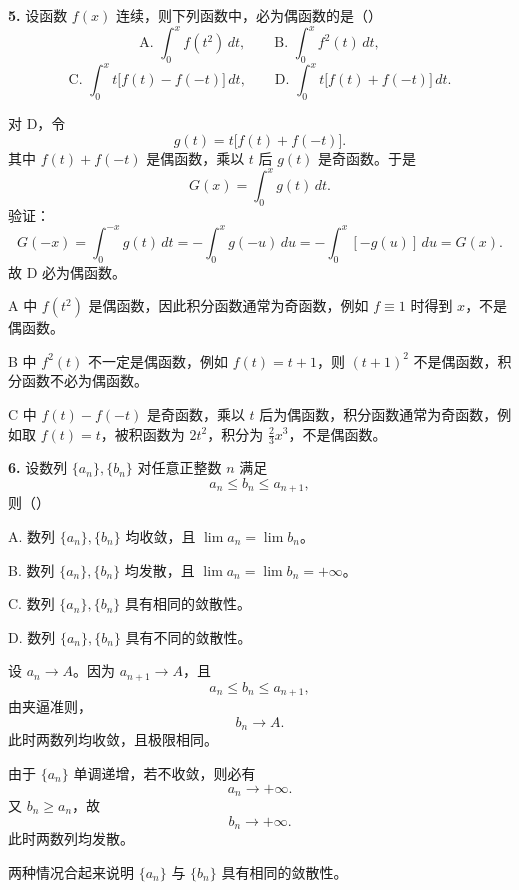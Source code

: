 \begin{problemblock}
\textbf{5.} 设函数 \(f(x)\) 连续，则下列函数中，必为偶函数的是（\quad）
\[
\text{A. }\int_0^x f(t^2)\,dt,\qquad
\text{B. }\int_0^x f^2(t)\,dt,
\]
\[
\text{C. }\int_0^x t\bigl[f(t)-f(-t)\bigr]\,dt,\qquad
\text{D. }\int_0^x t\bigl[f(t)+f(-t)\bigr]\,dt.
\]
\end{problemblock}

\begin{solutionblock}

对 D，令
\[
g(t)=t\bigl[f(t)+f(-t)\bigr].
\]
其中 \(f(t)+f(-t)\) 是偶函数，乘以 \(t\) 后 \(g(t)\) 是奇函数。于是
\[
G(x)=\int_0^x g(t)\,dt.
\]
验证：
\[
G(-x)=\int_0^{-x}g(t)\,dt
=-\int_0^x g(-u)\,du
=-\int_0^x[-g(u)]\,du
=G(x).
\]
故 D 必为偶函数。

A 中 \(f(t^2)\) 是偶函数，因此积分函数通常为奇函数，例如 \(f\equiv1\) 时得到 \(x\)，不是偶函数。

B 中 \(f^2(t)\) 不一定是偶函数，例如 \(f(t)=t+1\)，则 \((t+1)^2\) 不是偶函数，积分函数不必为偶函数。

C 中 \(f(t)-f(-t)\) 是奇函数，乘以 \(t\) 后为偶函数，积分函数通常为奇函数，例如取 \(f(t)=t\)，被积函数为 \(2t^2\)，积分为 \(\frac23x^3\)，不是偶函数。

\end{solutionblock}

\begin{problemblock}
\textbf{6.} 设数列 \(\{a_n\},\{b_n\}\) 对任意正整数 \(n\) 满足
\[
a_n\le b_n\le a_{n+1},
\]
则（\quad）

A. 数列 \(\{a_n\},\{b_n\}\) 均收敛，且 \(\lim a_n=\lim b_n\)。

B. 数列 \(\{a_n\},\{b_n\}\) 均发散，且 \(\lim a_n=\lim b_n=+\infty\)。

C. 数列 \(\{a_n\},\{b_n\}\) 具有相同的敛散性。

D. 数列 \(\{a_n\},\{b_n\}\) 具有不同的敛散性。
\end{problemblock}

\begin{solutionblock}

设 \(a_n\to A\)。因为 \(a_{n+1}\to A\)，且
\[
a_n\le b_n\le a_{n+1},
\]
由夹逼准则，
\[
b_n\to A.
\]
此时两数列均收敛，且极限相同。

由于 \(\{a_n\}\) 单调递增，若不收敛，则必有
\[
a_n\to+\infty.
\]
又 \(b_n\ge a_n\)，故
\[
b_n\to+\infty.
\]
此时两数列均发散。

两种情况合起来说明 \(\{a_n\}\) 与 \(\{b_n\}\) 具有相同的敛散性。

\end{solutionblock}

